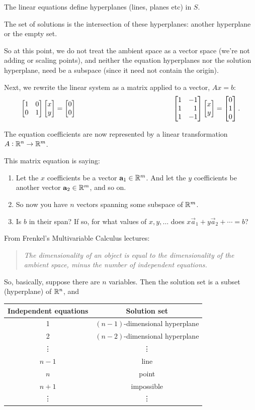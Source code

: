 The linear equations define hyperplanes (lines, planes etc) in $S$.

The set of solutions is the intersection of these hyperplanes: another
hyperplane or the empty set.

So at this point, we do not treat the ambient space as a vector space (we're
not adding or scaling points), and neither the equation hyperplanes nor the
solution hyperplane, need be a subspace (since it need not contain the origin).

Next, we rewrite the linear system as a matrix applied to a vector, $Ax = b$:
\begin{align*}
  \begin{array}{cc}
    \begin{bmatrix}1 & 0\\0 & 1\\ \end{bmatrix} \begin{bmatrix}x\\y\end{bmatrix} = \begin{bmatrix}0\\0\end{bmatrix}
    ~~~~~~~~~~~~~~~~~~~~~~~~~~~~~~~~~~~~~~~&
    \begin{bmatrix}1 & -1\\1 & ~~1\\1 & -1\\ \end{bmatrix} \begin{bmatrix}x\\y\end{bmatrix} = \begin{bmatrix}0\\1\\0\end{bmatrix}.
  \end{array}
\end{align*}

The equation coefficients are now represented by a linear transformation
$A:\mathbb{R}^n \to \mathbb{R}^m$.

This matrix equation is saying:
\begin{enumerate}
\item Let the $x$ coefficients be a vector $\mathbf a_1 \in  \mathbb{R}^m$. And let the $y$
  coefficients be another vector $\mathbf a_2 \in  \mathbb{R}^m$, and so on.
\item So now you have $n$ vectors spanning some subspace of $\mathbb{R}^m$.
\item Is $b$ in their span? If so, for what values of $x, y, \ldots$ does
  $x\vec a_1 + y\vec a_2 + \cdots = b$?
\end{enumerate}

From Frenkel's Multivariable Calculus lectures:

\begin{center}
  \begin{quote}
    \textit{The dimensionality of an object is equal to the dimensionality of the
      ambient space, minus the number of independent equations.}
  \end{quote}
\end{center}

So, basically, suppose there are $n$ variables. Then the solution set is a
subset (hyperplane) of $\mathbb{R}^n$, and

\begin{tabular}{c|c}
  Independent equations & Solution set\\
  \hline
  1                     & $(n - 1)$-dimensional hyperplane \\
  2                     & $(n - 2)$-dimensional hyperplane \\
  \vdots                & \vdots \\
  $n-1$                 & line \\
  $n$                   & point \\
  $n + 1$               & impossible \\
  \vdots                & \vdots
\end{tabular}

